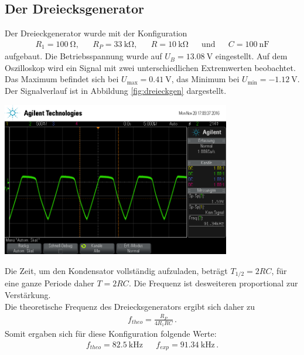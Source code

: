 \documentclass[]{scrartcl}
\begin{document}
\subsection{Der Dreiecksgenerator}
Der Dreieckgenerator wurde mit der Konfiguration
\begin{align*}
R_1=\SI{100}{\ohm}, && R_P=\SI{33}{\kilo\ohm}, && R=\SI{10}{\kilo\ohm} && \text{und} && C=\SI{100}{\nano\farad}
\end{align*}
aufgebaut. Die Betriebsspannung wurde auf $U_B=\SI{13.08}{\volt}$ eingestellt. Auf dem Oszilloskop wird ein Signal mit zwei unterschiedlichen Extremwerten beobachtet. Das Maximum befindet sich bei $U_{\text{max}}=\SI{0.41}{\volt}$, das Minimum bei $U_{\text{min}}=\SI{-1.12}{\volt}$.
Der Signalverlauf ist in Abbildung \ref{fig:dreieckgen} dargestellt.
\begin{center}
	\includegraphics[width=10cm]{images/dreieckgen.png}
	\label{fig:dreieckgen}
\end{center}
Die Zeit, um den Kondensator vollständig aufzuladen, beträgt $T_ {1/2}=2RC$, für eine ganze Periode daher $T=2RC$. Die Frequenz ist desweiteren proportional zur Verstärkung. \\
Die theoretische Frequenz des Dreiecksgenerators ergibt sich daher zu
\begin{align}
f_{theo}=\frac{R_P}{4R_1RC}\,.
\end{align}
Somit ergaben sich für diese Konfiguration folgende Werte:
\begin{align}
f_{theo}=\SI{82.5}{\kilo\hertz} &  & f_{exp}=\SI{91.34}{\kilo\hertz}\,.
\end{align}
\end{document}
